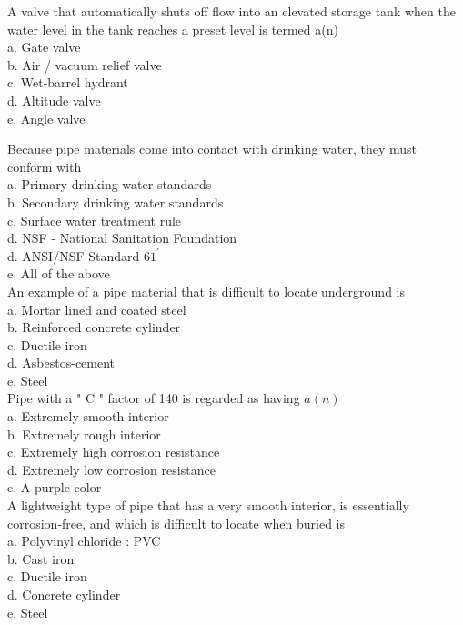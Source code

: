 A valve that automatically shuts off flow into an elevated storage tank when the water level in the tank reaches a preset level is termed a(n)\\
a. Gate valve\\
b. Air / vacuum relief valve\\
c. Wet-barrel hydrant\\
d. Altitude valve\\
e. Angle valve

  Because pipe materials come into contact with drinking water, they must conform with\\
a. Primary drinking water standards\\
b. Secondary drinking water standards\\
c. Surface water treatment rule\\
d. NSF - National Sanitation Foundation\\
d. ANSI/NSF Standard $61^{\prime}$\\
e. All of the above\\

  An example of a pipe material that is difficult to locate underground is\\
a. Mortar lined and coated steel\\
b. Reinforced concrete cylinder\\
c. Ductile iron\\
d. Asbestos-cement\\
e. Steel\\

Pipe with a " $\mathrm{C}$ " factor of 140 is regarded as having $a(n)$\\
a. Extremely smooth interior\\
b. Extremely rough interior\\
c. Extremely high corrosion resistance\\
d. Extremely low corrosion resistance\\
e. A purple color\\

  A lightweight type of pipe that has a very smooth interior, is essentially corrosion-free, and which is difficult to locate when buried is\\
a. Polyvinyl chloride : PVC\\
b. Cast iron\\
c. Ductile iron\\
d. Concrete cylinder\\
e. Steel\\

